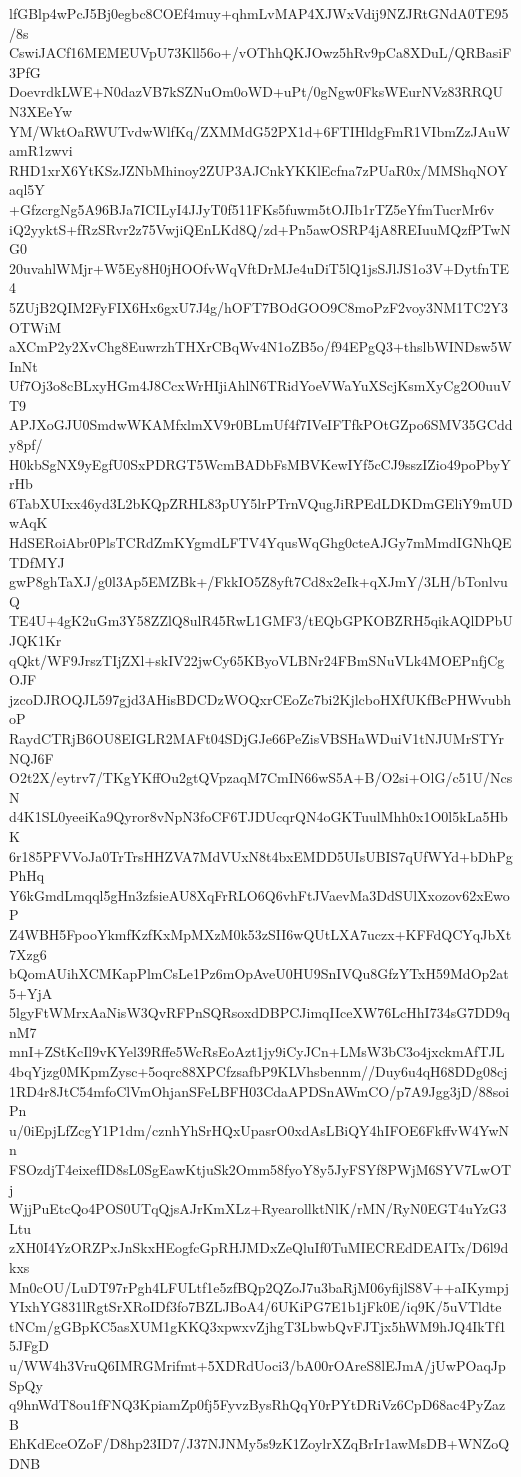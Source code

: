 lfGBlp4wPcJ5Bj0egbc8COEf4muy+qhmLvMAP4XJWxVdij9NZJRtGNdA0TE95/8s
CswiJACf16MEMEUVpU73Kll56o+/vOThhQKJOwz5hRv9pCa8XDuL/QRBasiF3PfG
DoevrdkLWE+N0dazVB7kSZNuOm0oWD+uPt/0gNgw0FksWEurNVz83RRQUN3XEeYw
YM/WktOaRWUTvdwWlfKq/ZXMMdG52PX1d+6FTIHldgFmR1VIbmZzJAuWamR1zwvi
RHD1xrX6YtKSzJZNbMhinoy2ZUP3AJCnkYKKlEcfna7zPUaR0x/MMShqNOYaql5Y
+GfzcrgNg5A96BJa7ICILyI4JJyT0f511FKs5fuwm5tOJIb1rTZ5eYfmTucrMr6v
iQ2yyktS+fRzSRvr2z75VwjiQEnLKd8Q/zd+Pn5awOSRP4jA8REIuuMQzfPTwNG0
20uvahlWMjr+W5Ey8H0jHOOfvWqVftDrMJe4uDiT5lQ1jsSJlJS1o3V+DytfnTE4
5ZUjB2QIM2FyFIX6Hx6gxU7J4g/hOFT7BOdGOO9C8moPzF2voy3NM1TC2Y3OTWiM
aXCmP2y2XvChg8EuwrzhTHXrCBqWv4N1oZB5o/f94EPgQ3+thslbWINDsw5WInNt
Uf7Oj3o8cBLxyHGm4J8CcxWrHIjiAhlN6TRidYoeVWaYuXScjKsmXyCg2O0uuVT9
APJXoGJU0SmdwWKAMfxlmXV9r0BLmUf4f7IVeIFTfkPOtGZpo6SMV35GCddy8pf/
H0kbSgNX9yEgfU0SxPDRGT5WcmBADbFsMBVKewIYf5cCJ9sszIZio49poPbyYrHb
6TabXUIxx46yd3L2bKQpZRHL83pUY5lrPTrnVQugJiRPEdLDKDmGEliY9mUDwAqK
HdSERoiAbr0PlsTCRdZmKYgmdLFTV4YqusWqGhg0cteAJGy7mMmdIGNhQETDfMYJ
gwP8ghTaXJ/g0l3Ap5EMZBk+/FkkIO5Z8yft7Cd8x2eIk+qXJmY/3LH/bTonlvuQ
TE4U+4gK2uGm3Y58ZZlQ8ulR45RwL1GMF3/tEQbGPKOBZRH5qikAQlDPbUJQK1Kr
qQkt/WF9JrszTIjZXl+skIV22jwCy65KByoVLBNr24FBmSNuVLk4MOEPnfjCgOJF
jzcoDJROQJL597gjd3AHisBDCDzWOQxrCEoZc7bi2KjlcboHXfUKfBcPHWvubhoP
RaydCTRjB6OU8EIGLR2MAFt04SDjGJe66PeZisVBSHaWDuiV1tNJUMrSTYrNQJ6F
O2t2X/eytrv7/TKgYKffOu2gtQVpzaqM7CmIN66wS5A+B/O2si+OlG/c51U/NcsN
d4K1SL0yeeiKa9Qyror8vNpN3foCF6TJDUcqrQN4oGKTuulMhh0x1O0l5kLa5HbK
6r185PFVVoJa0TrTrsHHZVA7MdVUxN8t4bxEMDD5UIsUBIS7qUfWYd+bDhPgPhHq
Y6kGmdLmqql5gHn3zfsieAU8XqFrRLO6Q6vhFtJVaevMa3DdSUlXxozov62xEwoP
Z4WBH5FpooYkmfKzfKxMpMXzM0k53zSII6wQUtLXA7uczx+KFFdQCYqJbXt7Xzg6
bQomAUihXCMKapPlmCsLe1Pz6mOpAveU0HU9SnIVQu8GfzYTxH59MdOp2at5+YjA
5lgyFtWMrxAaNisW3QvRFPnSQRsoxdDBPCJimqIIceXW76LcHhI734sG7DD9qnM7
mnI+ZStKcIl9vKYel39Rffe5WcRsEoAzt1jy9iCyJCn+LMsW3bC3o4jxckmAfTJL
4bqYjzg0MKpmZysc+5oqrc88XPCfzsafbP9KLVhsbennm//Duy6u4qH68DDg08cj
1RD4r8JtC54mfoClVmOhjanSFeLBFH03CdaAPDSnAWmCO/p7A9Jgg3jD/88soiPn
u/0iEpjLfZcgY1P1dm/cznhYhSrHQxUpasrO0xdAsLBiQY4hIFOE6FkffvW4YwNn
FSOzdjT4eixefID8sL0SgEawKtjuSk2Omm58fyoY8y5JyFSYf8PWjM6SYV7LwOTj
WjjPuEtcQo4POS0UTqQjsAJrKmXLz+RyearollktNlK/rMN/RyN0EGT4uYzG3Ltu
zXH0I4YzORZPxJnSkxHEogfcGpRHJMDxZeQluIf0TuMIECREdDEAITx/D6l9dkxs
Mn0cOU/LuDT97rPgh4LFULtf1e5zfBQp2QZoJ7u3baRjM06yfijlS8V++aIKympj
YIxhYG831lRgtSrXRoIDf3fo7BZLJBoA4/6UKiPG7E1b1jFk0E/iq9K/5uVTldte
tNCm/gGBpKC5asXUM1gKKQ3xpwxvZjhgT3LbwbQvFJTjx5hWM9hJQ4IkTf15JFgD
u/WW4h3VruQ6IMRGMrifmt+5XDRdUoci3/bA00rOAreS8lEJmA/jUwPOaqJpSpQy
q9hnWdT8ou1fFNQ3KpiamZp0fj5FyvzBysRhQqY0rPYtDRiVz6CpD68ac4PyZazB
EhKdEceOZoF/D8hp23ID7/J37NJNMy5s9zK1ZoylrXZqBrIr1awMsDB+WNZoQDNB
